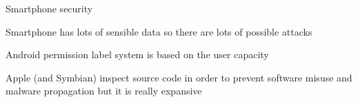 \begin{frame}[fragile]{Smartphone security}
  
  Smartphone has lots of sensible data so there are lots of possible attacks

  \vfill
  
  Android permission label system is based on the user capacity

  \vfill

  Apple (and Symbian) inspect source code in order to prevent software misuse
  and malware propagation but it is really expansive

\end{frame}